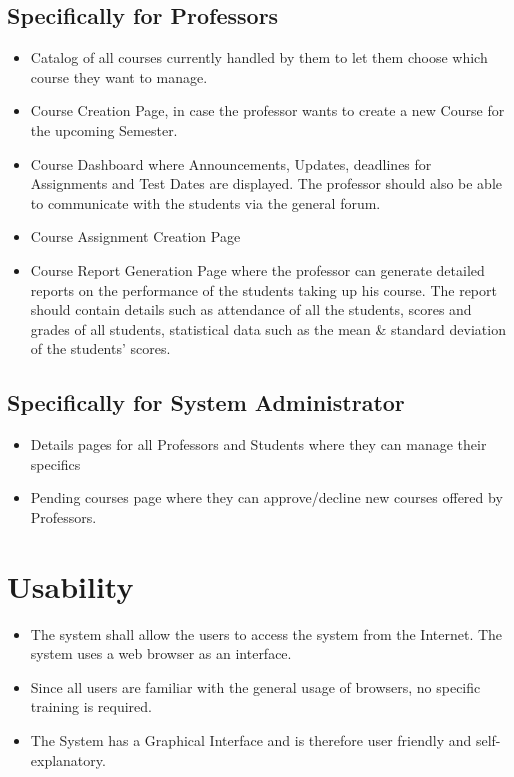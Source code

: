 \documentclass[12pt, a4]{report}
\begin{document}
\subsection{Specifically for Professors}
\begin{itemize}
    \item Catalog of all courses currently handled by them to let them choose which course they want to manage.
    \item Course Creation Page, in case the professor wants to create a new Course for the upcoming Semester.
    \item Course Dashboard where Announcements, Updates, deadlines for Assignments and Test Dates are displayed. The professor should also be able to communicate with the students via the general forum.
    \item Course Assignment Creation Page
    \item Course Report Generation Page where the professor can generate detailed reports on the performance of the students taking up his course. The report should contain details such as attendance of all the students, scores and grades of all students, statistical data such as the mean \& standard deviation of the students' scores.
\end{itemize}

\subsection{Specifically for System Administrator}
\begin{itemize}
    \item Details pages for all Professors and Students where they can manage their specifics
    \item Pending courses page where they can approve/decline new courses offered by Professors.
\end{itemize}


\section{Usability}
\begin{itemize}
    \item The system shall allow the users to access the system from the Internet. The system uses a web browser as an interface.
    \item Since all users are familiar with the general usage of browsers, no specific training is required.
    \item The System has a Graphical Interface and is therefore user friendly and self-explanatory.
\end{itemize}
\end{document}
